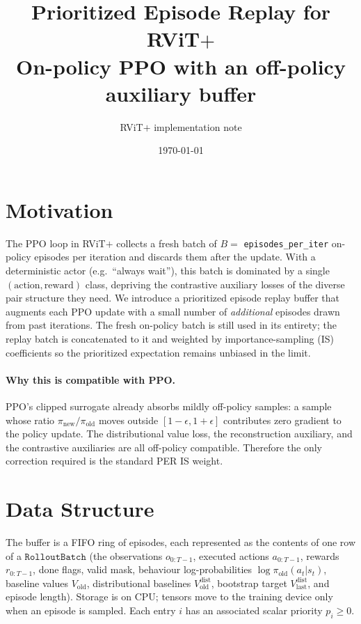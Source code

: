 \documentclass[11pt]{article}
\title{Prioritized Episode Replay for RViT$+$ \\
\large On-policy PPO with an off-policy auxiliary buffer}
\author{RViT$+$ implementation note}
\date{\today}
\begin{document}
\maketitle

\section{Motivation}

The PPO loop in RViT$+$ collects a fresh batch of $B = $ \texttt{episodes\_per\_iter}
on-policy episodes per iteration and discards them after the update.
With a deterministic actor (e.g.\ ``always wait''), this batch is
dominated by a single $(\text{action}, \text{reward})$ class, depriving
the contrastive auxiliary losses of the diverse pair structure they
need. We introduce a prioritized episode replay buffer that augments
each PPO update with a small number of \emph{additional} episodes
drawn from past iterations. The fresh on-policy batch is still used in
its entirety; the replay batch is concatenated to it and weighted by
importance-sampling (IS) coefficients so the prioritized expectation
remains unbiased in the limit.

\paragraph{Why this is compatible with PPO.}
PPO's clipped surrogate already absorbs mildly off-policy samples: a
sample whose ratio $\pi_{\text{new}}/\pi_{\text{old}}$ moves outside
$[1-\epsilon, 1+\epsilon]$ contributes zero gradient to the policy
update. The distributional value loss, the reconstruction auxiliary,
and the contrastive auxiliaries are all off-policy compatible.
Therefore the only correction required is the standard PER IS weight.

\section{Data Structure}

The buffer is a FIFO ring of episodes, each represented as the contents
of one row of a $\texttt{RolloutBatch}$ (the observations
$o_{0:T-1}$, executed actions $a_{0:T-1}$, rewards $r_{0:T-1}$,
done flags, valid mask, behaviour log-probabilities $\log \pi_{\text{old}}(a_t|s_t)$,
baseline values $V_{\text{old}}$, distributional baselines $V^{\text{dist}}_{\text{old}}$,
bootstrap target $V^{\text{dist}}_{\text{last}}$, and episode length).
Storage is on CPU; tensors move to the training device only when an
episode is sampled. Each entry $i$ has an associated scalar priority
$p_i \geq 0$.
\end{document}
